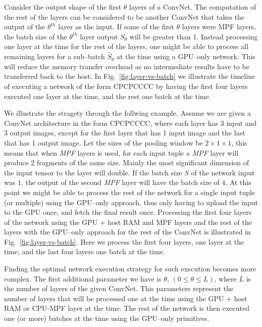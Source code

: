 \documentclass[conference]{./IEEEtran}
\begin{document}
  Consider the output shape of the first $\theta$ layers of a ConvNet.
  The computation of the rest of the layers can be considered to be
  another ConvNet that takes the output of the $\theta^{th}$ layer as
  the input.  If some of the first $\theta$ layers were MPF layers,
  the batch size of the $\theta^{th}$ layer output $S_{\theta}$ will
  be greater than 1.  Instead processing one layer at the time for the
  rest of the layers, one might be able to process all remaining
  layers for a sub--batch $\hat{S}_{\theta}$ at the time using a
  GPU--only network.  This will reduce the memory transfer overhead as
  no intermediate results have to be transferred back to the host.  In
  Fig.~\ref{fig:layer-vs-batch} we illustrate the timeline of
  executing a network of the form CPCPCCCC by having the first four
  layers executed one layer at the time, and the rest one batch at the
  time.

We illustrate the stragety through
  the follwing example.  Assume we are given a ConvNet architecture in
  the form CPCPCCCC, where each layer has 3 input and 3 output images,
  except for the first layer that has 1 input image and the last that
  has 1 output image.  Let the sizes of the pooling window be $2
  \times 1 \times 1$, this means that when \emph{MPF} layers is used,
  for each input tuple a \emph{MPF} layer will produce 2 fragments of
  the same size.  Mainly the most significant dimension of the input
  tensor to the layer will double.  If the batch size $S$ of the
  network input was $1$, the output of the second \emph{MPF} layer
  will have the batch size of $4$.  At this point we might be able to
  process the rest of the network for a single input tuple (or
  multiple) using the GPU--only approach, thus only having to upload
  the input to the GPU once, and fetch the final result once.
  Processing the first four layers of the network using the GPU + host
  RAM and MPF layers and the rest of the layers with the GPU--only
  approach for the rest of the ConvNet is illustrated in
  Fig.~\ref{fig:layer-vs-batch}.  Here we process the first four
  layers, one layer at the time, and the last four layers one batch at
  the time.

  Finding the optimal network execution strategy for such execution
  becomes more complex.  The first additional parameter we have is
  $\theta$, $(0 \le \theta \le L)$, where $L$ is the number of layers
  of the given ConvNet.  This parameters represent the number of
  layers that will be processed one at the time using the GPU + host
  RAM or CPU-MPF layer at the time.  The rest of the network is then
  executed one (or more) batches at the time using the GPU--only
  primitives.
\end{document}

